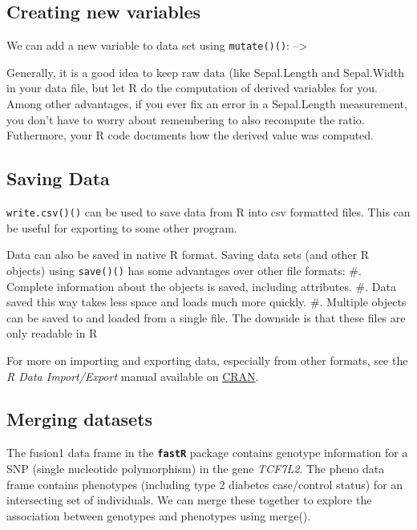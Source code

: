 \documentclass[]{book}
\begin{document}
\hypertarget{creating-new-variables}{%
\subsection{Creating new variables}\label{creating-new-variables}}

We can add a new variable to data set using \texttt{mutate()()}:
--\textgreater{}

Generally, it is a good idea to keep raw data (like {Sepal.Length} and {Sepal.Width} in your data file, but let R do the computation of derived variables for you. Among other advantages, if you ever fix an error in a {Sepal.Length} measurement, you don't have to worry about remembering to also recompute the ratio. Futhermore, your R code documents how the derived value was computed.

\hypertarget{saving-data}{%
\subsection{Saving Data}\label{saving-data}}

\texttt{write.csv()()} can be used to save data from R into csv formatted files. This can be useful for exporting to some other program.

Data can also be saved in native R format. Saving data sets (and other R objects) using \texttt{save()()} has some advantages over other file formats:
\#. Complete information about the objects is saved, including attributes.
\#. Data saved this way takes less space and loads much more quickly.
\#. Multiple objects can be saved to and loaded from a single file.
The downside is that these files are only readable in R

For more on importing and exporting data, especially from other formats, see the \emph{R Data Import/Export} manual available on \href{http://cran.r-project.org/manuals.html}{CRAN}.

\hypertarget{merging-datasets}{%
\subsection{Merging datasets}\label{merging-datasets}}

The {fusion1} data frame in the \textbf{\texttt{fastR}} package contains genotype information for a SNP (single nucleotide polymorphism) in the gene \emph{TCF7L2}. The {pheno} data frame contains phenotypes (including type 2 diabetes case/control status) for an intersecting set of individuals. We can merge these together to explore the association between genotypes and phenotypes using merge().
\end{document}
